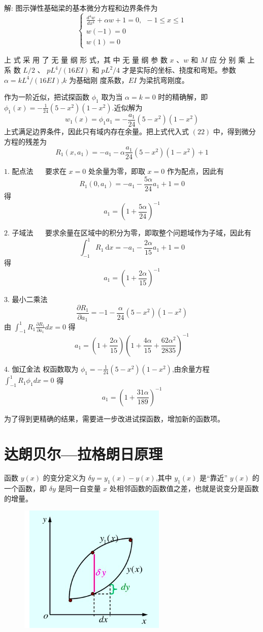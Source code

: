 \documentclass[12pt,a4paper]{article}
\begin{document}
解: 图示弹性基础梁的基本微分方程和边界条件为
\begin{equation}
\begin{cases}
\frac{d^4w}{dx^4}+\alpha w+1=0,~~-1\leqslant x\leqslant 1 \\
w(-1)=0 \\
w(1)=0
\end{cases}
\end{equation}

上 式 采 用 了 无 量 纲 形 式，其 中 无 量 纲 参 数 $x$ 、$w$ 和 $M$ 应 分 别 乘 上 系 数 $L/2$ 、
$pL^4/(16EI)$ 和 $pL^2/4$ 才是实际的坐标、挠度和弯矩。参数 $\alpha = kL^4/(16EI)$,$k$ 为基础刚
度系数，$EI$ 为梁抗弯刚度。

作为一阶近似，把试探函数 $\phi_1$ 取为当 $\alpha = k = 0$ 时的精确解，即 $\phi_1(x)= −\frac{1}{24}(5-x^2)(1−x^2)$.近似解为
$$
w_1(x)=\phi_1a_1= −\frac{a_1}{24}(5-x^2)(1−x^2)
$$
上式满足边界条件，因此只有域内存在余量。把上式代入式 $(22)$ 中，得到微分方程的残差为
$$
R_1(x,a_1)=-a_1-\alpha\frac{a_1}{24}(5-x^2)(1−x^2)+1
$$

$1$. 配点法 ~~ 要求在 $x=0$ 处余量为零，即取 $x=0$ 作为配点，因此有
$$
R_1(0,a_1)=-a_1-\frac{5\alpha}{24}a_1+1=0
$$
得
$$
a_1=(1+\frac{5\alpha}{24})^{-1}
$$

$2$. 子域法 ~~ 要求余量在区域中的积分为零，即取整个问题域作为子域，因此有
$$
\int_{-1}^{1} R_1 ~\mathrm{d}x=-a_1-\frac{2\alpha}{15}a_1+1=0
$$
得
$$
a_1=(1+\frac{2\alpha}{15})^{-1}
$$

$3$. 最小二乘法
$$
\frac{\partial R_1}{\partial a_1}=-1-\frac{\alpha}{24}(5-x^2)(1−x^2)
$$
由 $\int_{-1}^{1} R_1\frac{\partial R_1}{\partial a_1}dx=0$ 得
$$
a_1=(1+\frac{2\alpha}{15})(1+\frac{4\alpha}{15}+\frac{62\alpha ^2}{2835})^{-1}
$$

$4$. 伽辽金法  权函数取为 $\phi_1=−\frac{1}{24}(5-x^2)(1−x^2)$,由余量方程 $\int_{-1}^{1} R_1\phi_1dx=0$ 得
$$
a_1=(1+\frac{31\alpha}{189})^{-1}
$$

为了得到更精确的结果，需要进一步改进试探函数，增加新的函数项。

\section{达朗贝尔—拉格朗日原理}
函数 $y(x)$ 的变分定义为 $\delta y=y_1(x)-y(x)$,其中 $y_1(x)$ 是“靠近” $y(x)$ 的一个函数，即 
$\delta y$ 是同一自变量 $x$ 处相邻函数的函数值之差，也就是说变分是函数的增量。

\begin{figure}[H]
\centering
\includegraphics[scale=0.6]{./figures/3.png}
\caption{}
\end{figure}
\end{document}
